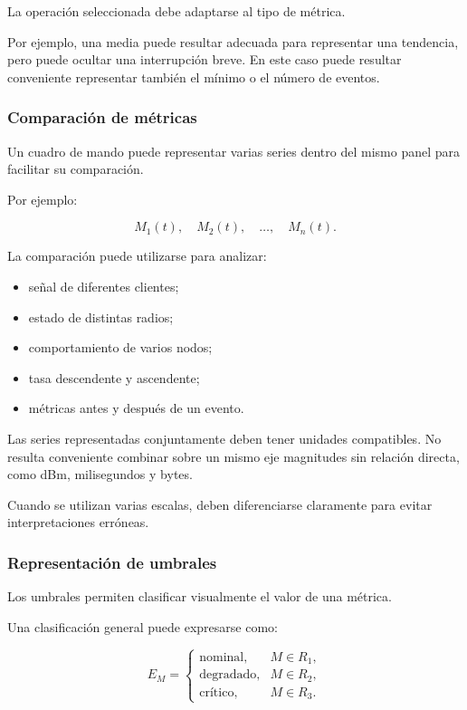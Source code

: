 La operación seleccionada debe adaptarse al tipo de métrica.

Por ejemplo, una media puede resultar adecuada para representar una
tendencia, pero puede ocultar una interrupción breve. En este caso puede
resultar conveniente representar también el mínimo o el número de
eventos.


\subsubsection*{Comparación de métricas}

Un cuadro de mando puede representar varias series dentro del mismo
panel para facilitar su comparación.

Por ejemplo:

\[
    M_1(t),
    \quad
    M_2(t),
    \quad
    \ldots,
    \quad
    M_n(t).
\]

La comparación puede utilizarse para analizar:

\begin{itemize}
    \item señal de diferentes clientes;

    \item estado de distintas radios;

    \item comportamiento de varios nodos;

    \item tasa descendente y ascendente;

    \item métricas antes y después de un evento.
\end{itemize}

Las series representadas conjuntamente deben tener unidades compatibles.
No resulta conveniente combinar sobre un mismo eje magnitudes sin
relación directa, como dBm, milisegundos y bytes.

Cuando se utilizan varias escalas, deben diferenciarse claramente para
evitar interpretaciones erróneas.


\subsubsection*{Representación de umbrales}

Los umbrales permiten clasificar visualmente el valor de una métrica.

Una clasificación general puede expresarse como:

\[
    E_M
    =
    \begin{cases}
        \text{nominal}, &
        M
        \in
        R_1,\\
        \text{degradado}, &
        M
        \in
        R_2,\\
        \text{crítico}, &
        M
        \in
        R_3.
    \end{cases}
\]

